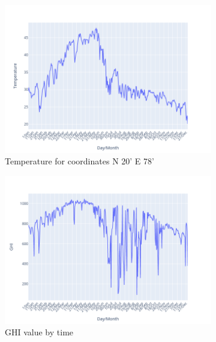 \documentclass[letterpaper]{article}
\begin{document}
\begin{figure}[h]
    \centering
    \begin{subfigure}{0.49\textwidth}
        \centering
        \includegraphics[width=1\textwidth]{Temperature}
        \caption{Temperature for coordinates N 20' E 78'}\label{fig:Temperature}
    \end{subfigure}
    \hfill
    \begin{subfigure}{0.49\textwidth}
        \centering
        \includegraphics[width=1\textwidth]{GHI}
        \caption{GHI value by time }\label{fig: Global Horizonatal Irradiance}
    \end{subfigure}
    \hfill
    \begin{subfigure}{0.49\textwidth}
        \centering

\end{subfigure}
\end{figure}
\end{document}
